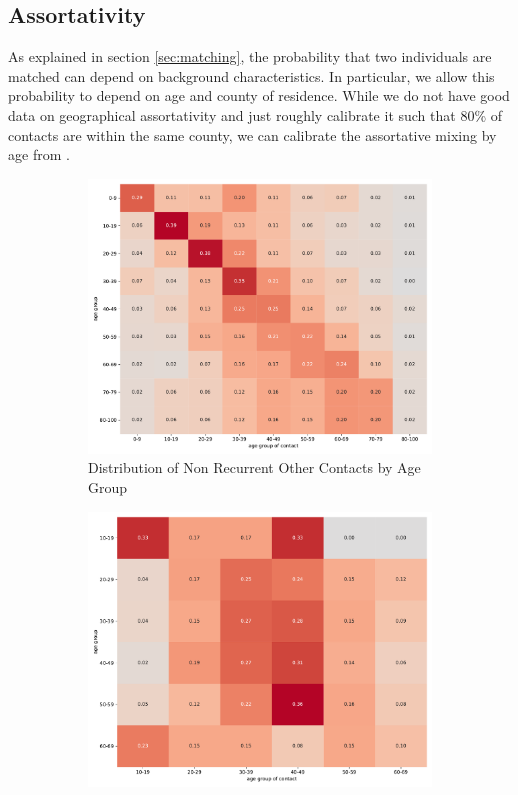 \subsection{Assortativity}
\label{subsec:assortativity}

As explained in section \ref{sec:matching}, the probability that two individuals are
matched can depend on background characteristics. In particular, we allow this
probability to depend on age and county of residence. While we do not have good data on
geographical assortativity and just roughly calibrate it such that 80\% of contacts are
within the same county, we can calibrate the assortative mixing by age from
\cite{Mossong2008}.

\begin{figure}[ht]
    \centering
    \begin{subfigure}[b]{0.425\textwidth}
        \centering
        \includegraphics[width=\textwidth]{figures/results/figures/data/assortativity_other_non_recurrent}
        \caption{{Distribution of Non Recurrent Other Contacts by Age Group}}
        \label{fig:assortativity_other}
    \end{subfigure}
    \hfill
    \begin{subfigure}[b]{0.425\textwidth}
        \centering
        \includegraphics[width=0.9 \textwidth]{figures/results/figures/data/assortativity_work_non_recurrent}

\end{subfigure}
\end{figure}
